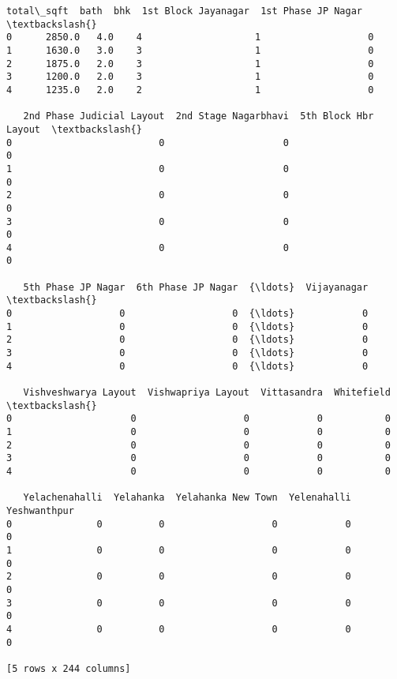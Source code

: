 \documentclass[11pt]{article}
\makeatletter
\newcommand{\boxspacing}{\kern\kvtcb@left@rule\kern\kvtcb@boxsep}
\newcommand{\prompt}[4]{
        {\ttfamily\llap{{\color{#2}[#3]:\hspace{3pt}#4}}\vspace{-\baselineskip}}
    }
\makeatother
\begin{document}
            \begin{tcolorbox}[breakable, size=fbox, boxrule=.5pt, pad at break*=1mm, opacityfill=0]
\prompt{Out}{outcolor}{55}{\boxspacing}
\begin{Verbatim}[commandchars=\\\{\}]
   total\_sqft  bath  bhk  1st Block Jayanagar  1st Phase JP Nagar  \textbackslash{}
0      2850.0   4.0    4                    1                   0
1      1630.0   3.0    3                    1                   0
2      1875.0   2.0    3                    1                   0
3      1200.0   2.0    3                    1                   0
4      1235.0   2.0    2                    1                   0

   2nd Phase Judicial Layout  2nd Stage Nagarbhavi  5th Block Hbr Layout  \textbackslash{}
0                          0                     0                     0
1                          0                     0                     0
2                          0                     0                     0
3                          0                     0                     0
4                          0                     0                     0

   5th Phase JP Nagar  6th Phase JP Nagar  {\ldots}  Vijayanagar  \textbackslash{}
0                   0                   0  {\ldots}            0
1                   0                   0  {\ldots}            0
2                   0                   0  {\ldots}            0
3                   0                   0  {\ldots}            0
4                   0                   0  {\ldots}            0

   Vishveshwarya Layout  Vishwapriya Layout  Vittasandra  Whitefield  \textbackslash{}
0                     0                   0            0           0
1                     0                   0            0           0
2                     0                   0            0           0
3                     0                   0            0           0
4                     0                   0            0           0

   Yelachenahalli  Yelahanka  Yelahanka New Town  Yelenahalli  Yeshwanthpur
0               0          0                   0            0             0
1               0          0                   0            0             0
2               0          0                   0            0             0
3               0          0                   0            0             0
4               0          0                   0            0             0

[5 rows x 244 columns]
\end{Verbatim}
\end{tcolorbox}
        
\end{document}
